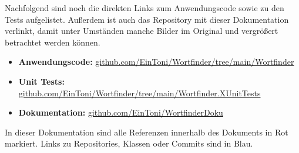 Nachfolgend sind noch die direkten Links zum Anwendungscode sowie zu den Tests aufgelistet. Außerdem ist auch das Repository mit dieser Dokumentation verlinkt, damit unter Umständen manche Bilder im Original und vergrößert betrachtet werden können.

\begin{itemize}
\item \textbf{Anwendungscode:} \href{https://github.com/EinToni/Wortfinder/tree/main/Wortfinder}{github.com/EinToni/Wortfinder/tree/main/Wortfinder}
\item \textbf{Unit Tests:} \href{https://github.com/EinToni/Wortfinder/tree/main/Wortfinder.XUnitTests}{github.com/EinToni/Wortfinder/tree/main/Wortfinder.XUnitTests}
\item \textbf{Dokumentation:} \href{https://github.com/EinToni/WortfinderDoku}{github.com/EinToni/WortfinderDoku}
\end{itemize}

In dieser Dokumentation sind alle Referenzen innerhalb des Dokuments in Rot markiert. Links zu Repositories, Klassen oder Commits sind in Blau.